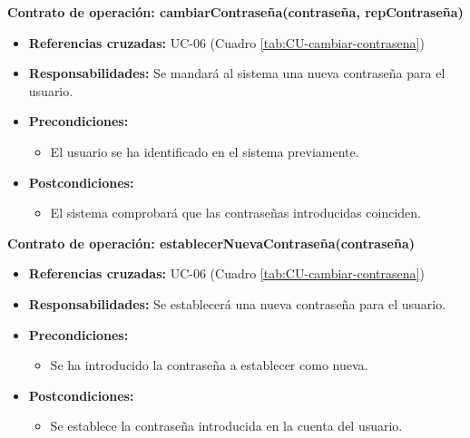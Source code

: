 \textbf{Contrato de operación: cambiarContraseña(contraseña, repContraseña)}
\begin{itemize}
\item \textbf{Referencias cruzadas:} UC-06 (Cuadro \ref{tab:CU-cambiar-contrasena})
\item \textbf{Responsabilidades:} Se mandará al sistema una nueva contraseña para el usuario.
\item \textbf{Precondiciones:} 
 \begin{itemize}
\item El usuario se ha identificado en el sistema previamente.
\end {itemize}
\item \textbf{Postcondiciones:} 
 \begin{itemize}
\item El sistema comprobará que las contraseñas introducidas coinciden.
\end {itemize}
\end {itemize}

\textbf{Contrato de operación: establecerNuevaContraseña(contraseña)}
\begin{itemize}
\item \textbf{Referencias cruzadas:} UC-06 (Cuadro \ref{tab:CU-cambiar-contrasena})
\item \textbf{Responsabilidades:} Se establecerá una nueva contraseña para el usuario.
\item \textbf{Precondiciones:} 
 \begin{itemize}
\item Se ha introducido la contraseña a establecer como nueva.
\end {itemize}
\item \textbf{Postcondiciones:} 
 \begin{itemize}
\item Se establece la contraseña introducida en la cuenta del usuario.
\end {itemize}
\end {itemize}


\vspace{7mm}
\dotfill
\vspace{7mm}

